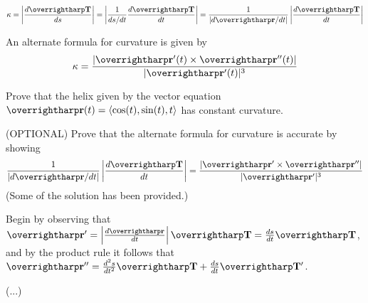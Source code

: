 \documentclass[letterpaper, twoside, 12pt]{book}
\begin{document}
\begin{theorem}
  \[
    \kappa
      =
    \left|
    \frac{d\vect{T}}{ds}
    \right|
      =
    \left|
    \frac{1}{ds/dt}
    \frac{d\vect{T}}{dt}
    \right|
      =
    \frac{1}{|d\vect{r}/dt|}
    \left|
      \frac{d\vect{T}}{dt}
    \right|
  \]
\end{theorem}

\begin{theorem}
  An alternate formula for curvature is given by
  \[
    \kappa =
    \frac{|\vect{r}'(t)\times\vect{r}''(t)|}{|\vect{r}'(t)|^3}
  \]
\end{theorem}

          \begin{problem}
            Prove that the helix given by the vector equation
            $\vect{r}(t) = \<\cos(t),\sin(t),t\>$
            has constant curvature.
          \end{problem}

          \begin{solution}

          \end{solution}

          \begin{problem}
            (OPTIONAL)
            Prove that the alternate formula for curvature is
            accurate by showing
            \[
              \frac{1}{|d\vect{r}/dt|}
              \left|
                \frac{d\vect{T}}{dt}
              \right|
                =
              \frac{|\vect{r}'\times\vect{r}''|}{|\vect{r}'|^3}
            \]
            (Some of the solution has been provided.)
          \end{problem}

          \begin{solution}
            Begin by observing that
            $
              \vect{r}'
                =
              \left|\frac{d\vect{r}}{dt}\right|\vect{T}
                =
              \frac{ds}{dt}\vect{T}
            $, and by the product rule it follows that
            $
              \vect{r}''
                =
              \frac{d^2s}{dt^2}\vect{T} + \frac{ds}{dt}\vect{T}'
            $.

            (...)

          \end{solution}
\end{document}
